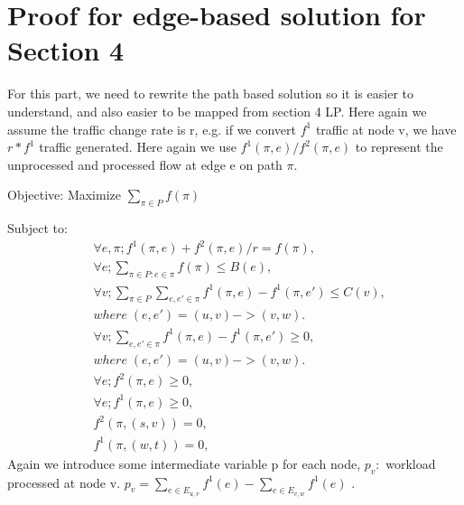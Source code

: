 \documentclass[twoside,leqno, 11pt]{article}
\begin{document}
\section{Proof for edge-based solution for Section 4}
For this part, we need to rewrite the path based solution so it is easier to understand, and also easier to be mapped from section 4 LP. Here again we assume the traffic change rate is r, e.g. if we convert $ f^1$ traffic at node v, we have $r*f^1$ traffic generated. Here again we use $f^1(\pi, e) /f^2(\pi, e)$ to represent the unprocessed and processed flow at edge e on path $\pi$.

Objective: Maximize  $\sum \limits_{\pi\in P} f(\pi) $
\newline

Subject to:
\newline
\begin{subequations}
\begin{align}
&\forall e, \pi;  f^1(\pi, e) +f^2(\pi, e)/r= f(\pi),\\
&\forall e; \sum \limits_{\pi\in P:e\in \pi} f(\pi) \leq B(e),\\
&\forall  v; \sum \limits_{\pi\in P} \sum \limits_{ e,e'\in \pi} f^1(\pi, e) -f^1(\pi, e')\leq C(v),\\
& where \;(e, e') = (u,v)->(v,w).\nonumber\\
&\forall  v; \sum \limits_{ e,e'\in \pi} f^1(\pi, e) -f^1(\pi, e')\geq 0,\\
& where \;(e, e') = (u,v)->(v,w).\nonumber\\
&\forall e; f^2(\pi,e)\geq 0, \\
&\forall e; f^1(\pi,e)\geq 0, \\
&f^2(\pi,(s,v))= 0, \\
&f^1(\pi, (w,t)) =0, 
\end{align}
\end{subequations}
Again we introduce some intermediate variable p for each node, $p_v: $ workload processed at node v.
\newline
$p_v = \sum\limits_{e \in E_{u, v} } f^1(e) - \sum\limits_{e \in E_{v, w} } f^1(e)  $ .
\newline
   
\end{document}
